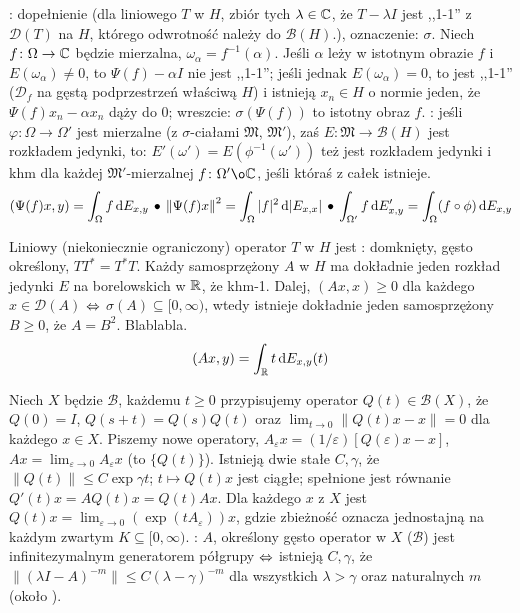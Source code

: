 : dopełnienie  (dla liniowego $T$ w $H$, zbiór tych $\lambda \in \mathbb{C}$, że $T - \lambda I$ jest ,,1-1'' z $\mathcal D(T)$ na $H$, którego odwrotność należy do $\mathcal B(H)$.), oznaczenie: $\sigma$.
Niech $f \colon \Omega \to \mathbb{C}$ będzie mierzalna, $\omega_\alpha = f^{-1}(\alpha)$.
Jeśli $\alpha$ leży w istotnym obrazie $f$ i $E(\omega_\alpha) \neq 0$, to $\Psi(f) - \alpha I$ nie jest ,,1-1''; jeśli jednak $E(\omega_\alpha) = 0$, to jest ,,1-1'' ($\mathcal D_f$ na gęstą podprzestrzeń właściwą $H$) i istnieją $x_n \in H$ o normie jeden, że $\Psi(f)x_n - \alpha x_n$ dąży do $0$; wreszcie: $\sigma(\Psi(f))$ to istotny obraz $f$.
: jeśli $\varphi \colon \Omega \to \Omega'$ jest mierzalne (z $\sigma$-ciałami $\mathfrak M$, $\mathfrak M'$), zaś $E \colon \mathfrak M \to \mathcal B(H)$ jest rozkładem jedynki, to: $E'(\omega') = E(\phi^{-1}(\omega'))$ też jest rozkładem jedynki i khm dla każdej $\mathfrak M'$-mierzalnej $f \colon \Omega' \o \C$, jeśli któraś z całek istnieje.
\[
	(\Psi(f)x, y) = \int_\Omega f \,\textrm{d}E_{x,y} \, \bullet \,
	\left\| \Psi(f)x\right\|^2 = \int_\Omega |f|^2 \,\textrm{d}|E_{x,x}| \, \bullet \,
	\int_{\Omega'} f \,\textrm{d}E_{x,y}' = \int_\Omega (f \circ \phi) \,\textrm{d}E_{x,y}	
\]

Liniowy (niekoniecznie ograniczony) operator $T$ w $H$  jest : domknięty, gęsto określony, $TT^* = T^*T$.
Każdy samosprzężony $A$ w $H$ ma dokładnie jeden rozkład jedynki $E$ na borelowskich w $\mathbb{R}$, że khm-1.
Dalej, $(Ax, x) \ge 0$ dla każdego $x \in \mathcal D(A)$ $\Leftrightarrow$ $\sigma(A) \subseteq [0, \infty)$, wtedy istnieje dokładnie jeden samosprzężony $B \ge 0$, że $A = B^2$.
Blablabla.
\[
	(Ax, y) = \int_{\mathbb{R}} t \,\textrm{d} E_{x, y}(t)
\]

Niech $X$  będzie $\mathscr B$, każdemu $t \ge 0$ przypisujemy operator $Q(t) \in \mathcal B(X)$, że $Q(0) = I$, $Q(s+t) = Q(s)Q(t)$ oraz $\lim_{t \to 0} \|Q(t) x - x\| = 0$ dla każdego $x \in X$.
Piszemy nowe operatory, $A_\varepsilon x = (1/ \varepsilon) [Q(\varepsilon)x - x]$, $Ax = \lim_{\varepsilon \to 0} A_\varepsilon x$ (to  $\{Q(t)\}$).
Istnieją dwie stałe $C, \gamma$, że $\|Q(t)\| \le C \exp \gamma t$; $t \mapsto Q(t)x$ jest ciągłe; spełnione jest równanie $Q'(t) x = AQ(t)x = Q(t)Ax$.
Dla każdego $x$ z $X$ jest $Q(t)x = \lim_{\varepsilon \to 0} (\exp (tA_\varepsilon)) x$, gdzie zbieżność oznacza jednostajną na każdym zwartym $K \subseteq [0, \infty)$.
: $A$, określony gęsto operator w $X$ ($\mathscr B$) jest infinitezymalnym generatorem półgrupy $\Leftrightarrow$ istnieją $C, \gamma$, że $\|(\lambda I - A)^{-m}\| \le C(\lambda -  \gamma)^{-m}$ dla wszystkich $\lambda > \gamma$ oraz naturalnych $m$ (około ).